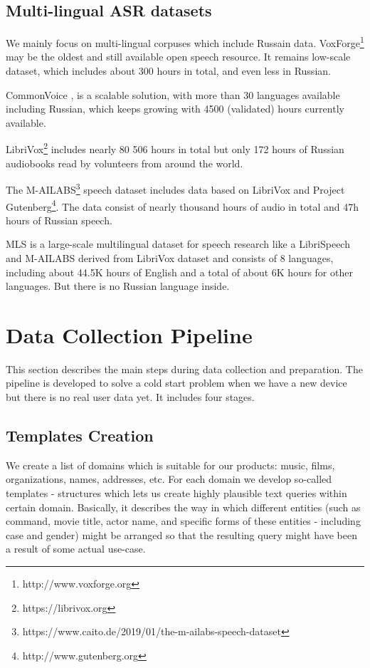 \documentclass[a4paper]{article}
\begin{document}
\subsection{Multi-lingual ASR datasets}

We mainly focus on multi-lingual corpuses which include Russain data. VoxForge\footnote{http://www.voxforge.org} may be the oldest and still available open speech resource. It remains low-scale dataset, which includes about 300 hours in total, and even less in Russian.

CommonVoice \cite{ardila2019common}, is a scalable solution, with more than 30 languages available including Russian, which keeps growing with 4500 (validated) hours currently available.

LibriVox\footnote{https://librivox.org} includes nearly 80 506 hours in total but only 172 hours of Russian audiobooks read by volunteers from around the world.

The M-AILABS\footnote{https://www.caito.de/2019/01/the-m-ailabs-speech-dataset} speech dataset includes data based on LibriVox and Project Gutenberg\footnote{http://www.gutenberg.org}. The data consist of nearly thousand hours of audio in total and 47h hours of Russian speech.

MLS \cite{pratap2020mls} is a large-scale multilingual dataset for speech research like a LibriSpeech and M-AILABS derived from LibriVox dataset and consists of 8 languages, including about 44.5K hours of English and a total of about 6K hours for other languages. But there is no Russian language inside.


\section{Data Collection Pipeline}

This section describes the main steps during data collection and preparation. The pipeline is developed to solve a cold start problem when we have a new device but there is no real user data yet. It includes four stages.

\subsection{Templates Creation}
We create a list of domains which is suitable for our products: music, films, organizations, names, addresses, etc.
For each domain we develop so-called templates - structures which lets us create highly plausible text queries within certain domain. Basically, it describes the way in which different entities (such as command, movie title, actor name, and specific forms of these entities - including case and gender) might be arranged so that the resulting query might have been a result of some actual use-case. 
\end{document}
